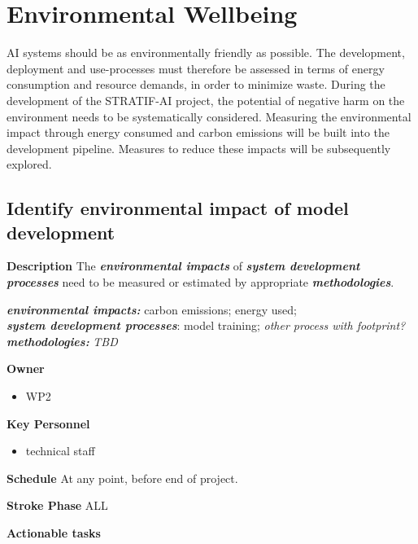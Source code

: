 \documentclass[
  letterpaper,
  DIV=11,
  numbers=noendperiod]{scrreport}
\providecommand{\tightlist}{%
  \setlength{\itemsep}{0pt}\setlength{\parskip}{0pt}}\usepackage{longtable,booktabs,array}
\begin{document}
\hypertarget{environmental-wellbeing}{%
\section{Environmental Wellbeing}\label{environmental-wellbeing}}

AI systems should be as environmentally friendly as possible. The
development, deployment and use-processes must therefore be assessed in
terms of energy consumption and resource demands, in order to minimize
waste. During the development of the STRATIF-AI project, the potential
of negative harm on the environment needs to be systematically
considered. Measuring the environmental impact through energy consumed
and carbon emissions will be built into the development pipeline.
Measures to reduce these impacts will be subsequently explored.

\hypertarget{identify-environmental-impact-of-model-development}{%
\subsection{Identify environmental impact of model
development}\label{identify-environmental-impact-of-model-development}}

\textbf{Description} The \textbf{\emph{environmental impacts}} of
\textbf{\emph{system development processes}} need to be measured or
estimated by appropriate \textbf{\emph{methodologies}}.

\textbf{\emph{environmental impacts:}} carbon emissions; energy used;\\
\textbf{\emph{system development processes}}: model training;
\emph{other process with footprint?}\\
\textbf{\emph{methodologies:}} \emph{TBD}

\textbf{Owner}

\begin{itemize}
\tightlist
\item
  WP2
\end{itemize}

\textbf{Key Personnel}

\begin{itemize}
\tightlist
\item
  technical staff
\end{itemize}

\textbf{Schedule} At any point, before end of project.

\textbf{Stroke Phase} ALL

\textbf{Actionable tasks}
\end{document}

